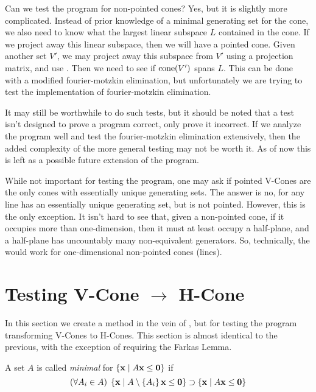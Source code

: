 \begin{Remark}
	Can we test the program for non-pointed cones?  Yes, but it is slightly more complicated.  Instead of prior knowledge of a minimal generating set for the cone, we also need to know what the largest linear subspace $L$ contained in the cone.  If we project away this linear subspace, then we will have a pointed cone.  Given another set $V'$, we may project away this subspace from $V'$ using a projection matrix, and use .  Then we need to see if $\operatorname{cone}(V')$ spans $L$.  This can be done with a modified fourier-motzkin elimination, but unfortunately we are trying to test the implementation of fourier-motzkin elimination.

	It may still be worthwhile to do such tests, but it should be noted that a test isn't designed to prove a program correct, only prove it incorrect.  If we analyze the program well and test the fourier-motzkin elimination extensively, then the added complexity of the more general testing may not be worth it.  As of now this is left as a possible future extension of the program.
\end{Remark}

\begin{Remark}
	While not important for testing the program, one may ask if pointed V-Cones are the only cones with essentially unique generating sets.  The answer is no, for any line has an essentially unique generating set, but is not pointed.  However, this is the only exception.  It isn't hard to see that, given a non-pointed cone, if it occupies more than one-dimension, then it must at least occupy a half-plane, and a half-plane has uncountably many non-equivalent generators.  So, technically, the  would work for one-dimensional non-pointed cones (lines).
\end{Remark}

\section{Testing V-Cone $\to$ H-Cone}

In this section we create a method in the vein of , but for testing the program transforming V-Cones to H-Cones.  This section is almost identical to the previous, with the exception of requiring the Farkas Lemma.

\begin{Def}
	A set $A$ is called \textit{minimal} for $\left\{\mathbf{x}\;|\; A\mathbf{x}\leq\mathbf{0}\right\}$ if
	\[ (\forall A_i \in A)\; \left\{\mathbf{x}\;|\; A\setminus\left\{A_i\right\}\mathbf{x}\leq\mathbf{0}\right\} \supset \left\{\mathbf{x}\;|\; A\mathbf{x}\leq\mathbf{0}\right\} \]
\end{Def}

